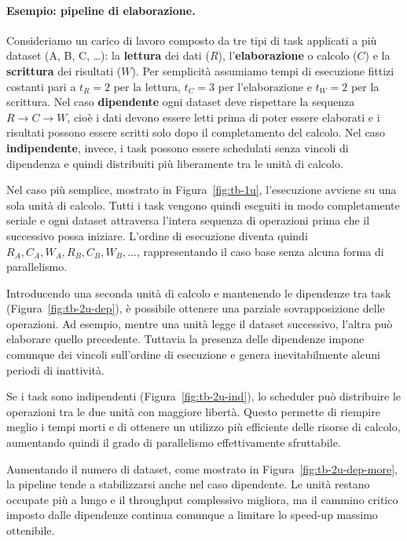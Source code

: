 \paragraph{Esempio: pipeline di elaborazione.}

Consideriamo un carico di lavoro composto da tre tipi di task applicati a più dataset
(A, B, C, \dots): la \textbf{lettura} dei dati ($R$), l'\textbf{elaborazione} o calcolo ($C$) e la \textbf{scrittura} dei risultati ($W$). 
Per semplicità assumiamo tempi di esecuzione fittizi costanti pari a $t_R = 2$ per la lettura, $t_C = 3$ per l'elaborazione e $t_W = 2$ per la scrittura. 
Nel caso \textbf{dipendente} ogni dataset deve rispettare la sequenza $R \rightarrow C \rightarrow W$, cioè i dati devono essere letti prima di poter essere elaborati e i risultati possono essere scritti solo dopo il completamento del calcolo. 
Nel caso \textbf{indipendente}, invece, i task possono essere schedulati senza vincoli di dipendenza e quindi distribuiti più liberamente tra le unità di calcolo.

Nel caso più semplice, mostrato in Figura~\ref{fig:tb-1u}, l'esecuzione avviene su una sola unità di calcolo. 
Tutti i task vengono quindi eseguiti in modo completamente seriale e ogni dataset attraversa l'intera sequenza di operazioni prima che il successivo possa iniziare. 
L'ordine di esecuzione diventa quindi $R_A, C_A, W_A, R_B, C_B, W_B,\dots$, rappresentando il caso base senza alcuna forma di parallelismo.

Introducendo una seconda unità di calcolo e mantenendo le dipendenze tra task (Figura~\ref{fig:tb-2u-dep}), è possibile ottenere una parziale sovrapposizione delle operazioni. 
Ad esempio, mentre una unità legge il dataset successivo, l'altra può elaborare quello precedente. 
Tuttavia la presenza delle dipendenze impone comunque dei vincoli sull'ordine di esecuzione e genera inevitabilmente alcuni periodi di inattività.

Se i task sono indipendenti (Figura~\ref{fig:tb-2u-ind}), lo scheduler può distribuire le operazioni tra le due unità con maggiore libertà. 
Questo permette di riempire meglio i tempi morti e di ottenere un utilizzo più efficiente delle risorse di calcolo, aumentando quindi il grado di parallelismo effettivamente sfruttabile.

Aumentando il numero di dataset, come mostrato in Figura~\ref{fig:tb-2u-dep-more}, la pipeline tende a stabilizzarsi anche nel caso dipendente. 
Le unità restano occupate più a lungo e il throughput complessivo migliora, ma il cammino critico imposto dalle dipendenze continua comunque a limitare lo speed-up massimo ottenibile.

